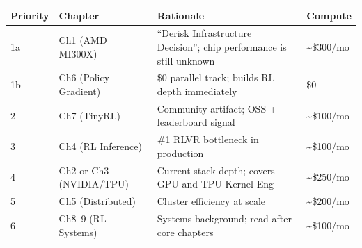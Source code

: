 \documentclass[10pt, letterpaper]{article}
\begin{document}
\begin{table}[h]
\centering
\small
\begin{tabular}{@{}llll@{}}
\toprule
\textbf{Priority} & \textbf{Chapter} & \textbf{Rationale} & \textbf{Compute} \\
\midrule
1a & Ch1 (AMD MI300X)      & ``Derisk Infrastructure Decision''; chip performance is still unknown & \textasciitilde\$300/mo \\
1b & Ch6 (Policy Gradient) & \$0 parallel track; builds RL depth immediately           & \$0 \\
2  & Ch7 (TinyRL)          & Community artifact; OSS + leaderboard signal             & \textasciitilde\$100/mo \\
3  & Ch4 (RL Inference)    & \#1 RLVR bottleneck in production                        & \textasciitilde\$100/mo \\
4  & Ch2 or Ch3 (NVIDIA/TPU) & Current stack depth; covers GPU and TPU Kernel Eng     & \textasciitilde\$250/mo \\
5  & Ch5 (Distributed)     & Cluster efficiency at scale                               & \textasciitilde\$200/mo \\
6  & Ch8--9 (RL Systems)   & Systems background; read after core chapters              & \textasciitilde\$100/mo \\
\bottomrule
\end{tabular}
\end{table}

\newpage









\end{document}
